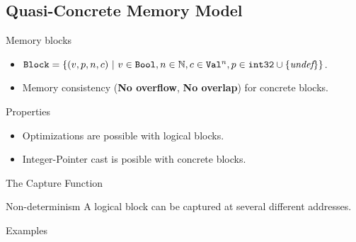 \subsection{Quasi-Concrete Memory Model}
\begin{frame}{\subsecname}

  \begin{block}{Memory blocks}
    \begin{itemize}
    \item $\texttt{Block}=\{(v,p,n,c)~|~v\in\texttt{Bool},n\in\mathbb{N},c\in\texttt{Val}^{n},p\in\texttt{int32}\cup\{\textit{undef}\}\}$.
    \item Memory consistency (\textbf{No overflow}, \textbf{No overlap}) for concrete blocks.
    \end{itemize}
  \end{block}
  \vfill
  \begin{exampleblock}{Properties}
    \begin{itemize}
    \item Optimizations are possible with logical blocks.
    \item Integer-Pointer cast is posible with concrete blocks.
    \end{itemize}
  \end{exampleblock}
  
\end{frame}

\begin{frame}{The Capture Function}

  \begin{minipage}{0.48\textwidth}
    
  \end{minipage}
  \begin{minipage}{0.48\textwidth}
    
  \end{minipage}
  \vfill
  \begin{alertblock}{Non-determinism}
    A logical block can be captured at several different addresses.
  \end{alertblock}
  
\end{frame}

\begin{frame}{Examples}

  \begin{minipage}{0.48\textwidth}
    \begin{center}
      
    \end{center}
  \end{minipage}
  \begin{minipage}{0.48\textwidth}
    
  \end{minipage}
  \vfill
  

\end{frame}
